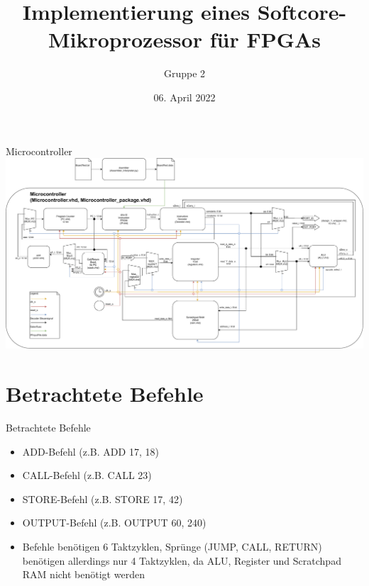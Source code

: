 \documentclass[10pt, t,
aspectratio=169,%
usenames,
dvipsnames,
]{beamer}
\title[Mikroprozessor Architektur] %
{Implementierung eines Softcore-Mikroprozessor für FPGAs}
\author[] %
{Gruppe 2}
\institute[] %
{
}
\date[] %
{06. April 2022}
\begin{document}
	\frame{\titlepage}
	\begin{frame}{Microcontroller}
		\includegraphics[width=.95\linewidth]{../Blockbeschreibungen/BlockdiagramMitVHDL.pdf}
	\end{frame}
	\section{Betrachtete Befehle}
	\begin{frame}{Betrachtete Befehle}
		\begin{itemize}
			\item ADD-Befehl (z.B. ADD 17, 18)
			\item CALL-Befehl (z.B. CALL 23)
			\item STORE-Befehl (z.B. STORE 17, 42)
			\item OUTPUT-Befehl (z.B. OUTPUT 60, 240)
			\item Befehle benötigen 6 Taktzyklen, Sprünge (JUMP, CALL, RETURN) benötigen allerdings nur 4 Taktzyklen, da ALU, Register und Scratchpad RAM nicht benötigt werden
		\end{itemize}
	\end{frame}
\end{document}

